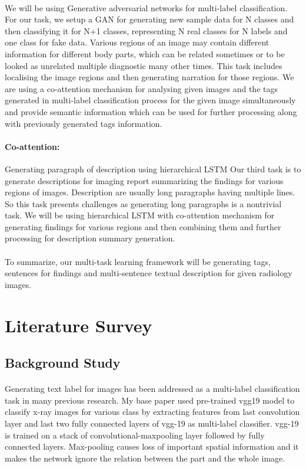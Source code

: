 \documentclass[12pt]{article}
\numberwithin{figure}{section}
\begin{document}
\paragraph{}
We will be using Generative adversarial networks for multi-label classification. For our task, we setup a GAN for generating new sample data for N classes and then classifying it for N+1 classes, representing N real classes for N labels and one class for fake data.
Various regions of an image may contain different information for different body parts, which can be related sometimes or to be looked as unrelated multiple diagnostic many other times. This task includes localising the image regions and then generating narration for those regions. We are using a co-attention mechanism for analysing given images and the tags generated in multi-label classification process for the given image simultaneously and provide semantic information which can be used for further processing along with previously generated tags information.
\paragraph{Co-attention:}
Generating paragraph of description using hierarchical LSTM
Our third task is to generate descriptions for imaging report summarizing the findings for various regions of images. Description are usually long paragraphs having multiple lines. So this task presents challenges as generating long paragraphs is a nontrivial task. We will be using hierarchical LSTM\cite{1} with co-attention mechanism for generating findings for various regions and then combining them and further processing for description summary generation.
\paragraph{}
To summarize, our multi-task learning framework  will be generating tags, sentences for findings and multi-sentence textual description for given radiology images.


\clearpage


\section{Literature Survey}
\subsection{Background Study}
\paragraph{}
Generating text label for images has been addressed as a multi-label classification task in many previous research. My base paper used pre-trained vgg19 model to classify x-ray images for various class by extracting features from last convolution layer and last two fully connected layers of vgg-19 as multi-label classifier. vgg-19 is trained on a stack of convolutional-maxpooling layer followed by fully connected layers. Max-pooling causes loss of important spatial information and it makes the network ignore the relation between the part and the whole image.
\end{document}
